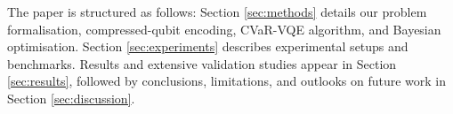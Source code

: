 The paper is structured as follows: Section \ref{sec:methods} details our problem formalisation, compressed-qubit encoding, CVaR-VQE algorithm, and Bayesian optimisation. Section \ref{sec:experiments} describes experimental setups and benchmarks. Results and extensive validation studies appear in Section \ref{sec:results}, followed by conclusions, limitations, and outlooks on future work in Section \ref{sec:discussion}.
